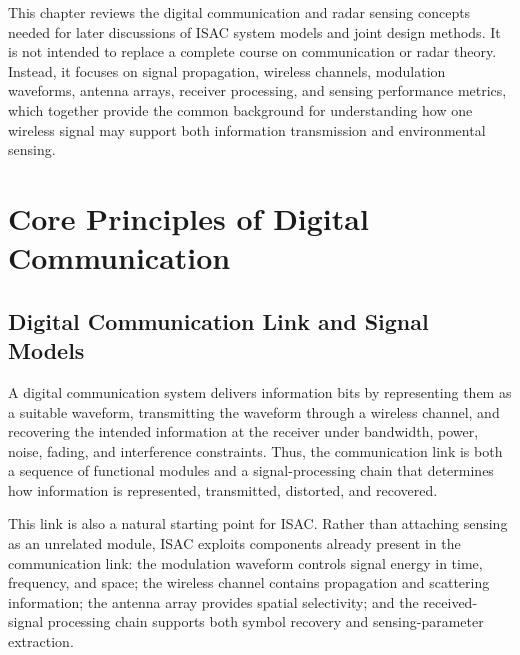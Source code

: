 
\label{sec:ch2-prerequisites-purpose}
 

This chapter reviews the digital communication and radar sensing concepts
needed for later discussions of ISAC system models and joint design methods.
It is not intended to replace a complete course on communication or radar
theory.
Instead, it focuses on signal propagation, wireless channels, modulation
waveforms, antenna arrays, receiver processing, and sensing performance
metrics, which together provide the common background for understanding how one
wireless signal may support both information transmission and environmental
sensing.
 


 

\section{Core Principles of Digital Communication}
\label{sec:ch2-digital-comm}


\subsection{Digital Communication Link and Signal Models}


A digital communication system delivers information bits by representing them
as a suitable waveform, transmitting the waveform through a wireless channel,
and recovering the intended information at the receiver under bandwidth, power,
noise, fading, and interference constraints.
Thus, the communication link is both a sequence of functional modules and a
signal-processing chain that determines how information is represented,
transmitted, distorted, and recovered.

This link is also a natural starting point for ISAC.
Rather than attaching sensing as an unrelated module, ISAC exploits components
already present in the communication link: the modulation waveform controls
signal energy in time, frequency, and space; the wireless channel contains
propagation and scattering information; the antenna array provides spatial
selectivity; and the received-signal processing chain supports both symbol
recovery and sensing-parameter extraction.

